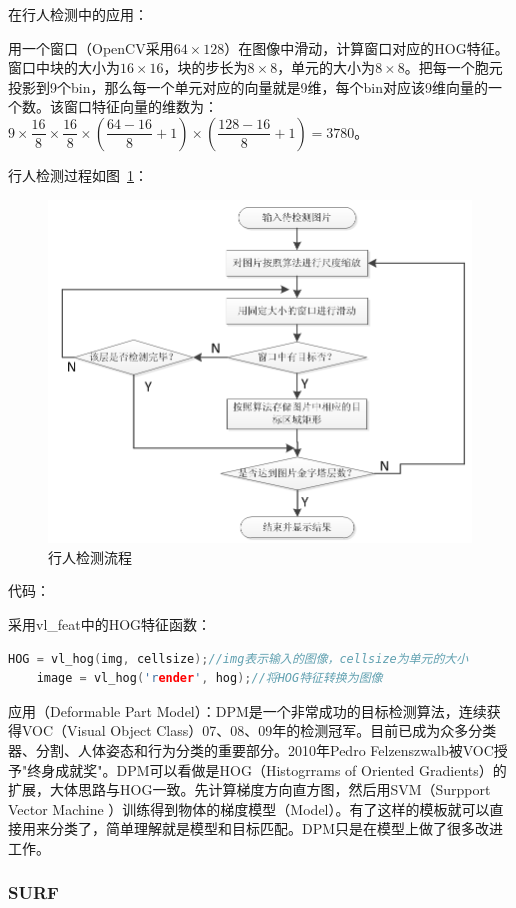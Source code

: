 \documentclass[12pt]{article}
\begin{document}
{\color{blue}在行人检测中的应用}：

用一个窗口（OpenCV采用$64 \times 128$）在图像中滑动，计算窗口对应的HOG特征。窗口中块的大小为$16 \times 16$，块的步长为$8 \times 8$，单元的大小为$8 \times 8$。把每一个胞元投影到9个bin，那么每一个单元对应的向量就是9维，每个bin对应该9维向量的一个数。该窗口特征向量的维数为：$9 \times \dfrac{16}{8} \times \dfrac{16}{8} \times (\dfrac{64-16}{8}+1) \times (\dfrac{128-16}{8}+1)=3780$。

行人检测过程如图~\ref{fig: HOG-HumanDetection}：

\begin{figure}
\centering
\includegraphics[width=0.5\linewidth]{HOG-HumanDetection.png}
\caption{行人检测流程}
\label{fig: HOG-HumanDetection}
\end{figure}


{\color{blue}代码}：

采用vl\_feat中的HOG特征函数：
    \begin{lstlisting}[language=C++]
    HOG = vl_hog(img, cellsize);//img表示输入的图像，cellsize为单元的大小
    image = vl_hog('render', hog);//将HOG特征转换为图像
    \end{lstlisting}
    
{\color{blue}应用（Deformable Part Model）}：DPM是一个非常成功的目标检测算法，连续获得VOC（Visual Object Class）07、08、09年的检测冠军。目前已成为众多分类器、分割、人体姿态和行为分类的重要部分。2010年Pedro Felzenszwalb被VOC授予"终身成就奖"。DPM可以看做是HOG（Histogrrams of Oriented Gradients）的扩展，大体思路与HOG一致。先计算梯度方向直方图，然后用SVM（Surpport Vector Machine ）训练得到物体的梯度模型（Model）。有了这样的模板就可以直接用来分类了，简单理解就是模型和目标匹配。DPM只是在模型上做了很多改进工作。


  
\subsubsection{SURF}
\end{document}
